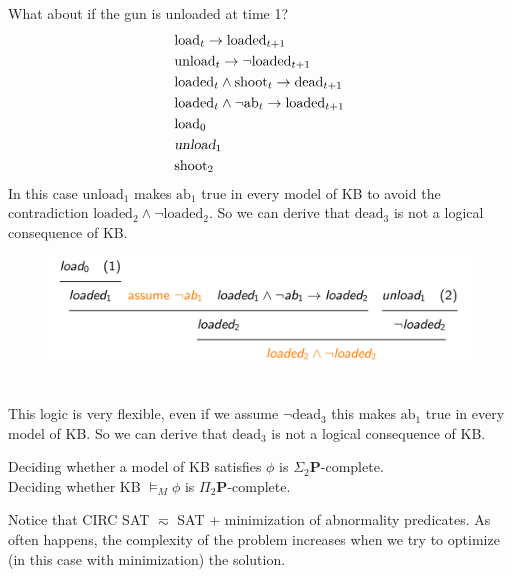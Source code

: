 What about if the gun is unloaded at time 1? 
\begin{align*}
    &\text{load}_t\to \text{loaded}_{t+1}\\
    &\text{unload}_t\to \neg \text{loaded}_{t+1}\\
    &\text{loaded}_t\land \text{shoot}_t\to \text{dead}_{t+1}\\
    &\text{loaded}_t\land\neg\text{ab}_t\to \text{loaded}_{t+1}\\
    &\text{load}_0 \\
    & \textsl{unload}_1 \\
    &\text{shoot}_2
\end{align*}
In this case $\text{unload}_1$ makes $\text{ab}_1$
true in every model of KB to avoid the contradiction $\text{loaded}_2\land \neg\text{loaded}_2$. So we can derive that $\text{dead}_3$ is not a logical consequence of KB.
\begin{figure}[h]
    \centering
    \includegraphics[width=1\textwidth]{img/ysp3.jpeg}
\end{figure}\\
This logic is very flexible, even if we assume $\neg\text{dead}_3$ this makes $\text{ab}_1$ true in every model of KB. So we can derive that $\text{dead}_3$ is not a logical consequence of KB.
\begin{defbox}
    Deciding whether a model of KB satisfies $\phi$ is $\Sigma_2\mathbf{P}$-complete.\\
    Deciding whether KB $\vDash_M \phi$ is $\Pi_2\mathbf{P}$-complete.
\end{defbox}
Notice that CIRC SAT $\eqsim$ SAT + minimization of abnormality predicates. As often happens, the complexity of the problem increases when we try to optimize (in this case with minimization) the solution.

